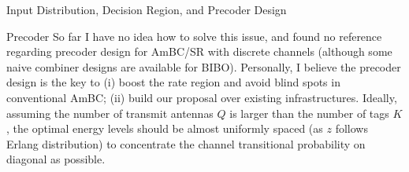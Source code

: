 \documentclass[journal]{IEEEtran}
\begin{document}
\begin{section}{Input Distribution, Decision Region, and Precoder Design}
\begin{subsection}{Precoder}
			So far I have no idea how to solve this issue, and found no reference regarding precoder design for AmBC/SR with discrete channels (although some naive combiner designs are available for BIBO). Personally, I believe the precoder design is the key to (i) boost the rate region and avoid blind spots in conventional AmBC; (ii) build our proposal over existing infrastructures. Ideally, assuming the number of transmit antennas $Q$ is larger than the number of tags $K$, the optimal energy levels should be almost uniformly spaced (as $z$ follows Erlang distribution) to concentrate the channel transitional probability on diagonal as possible.
		\end{subsection}
	\end{section}

\end{document}
